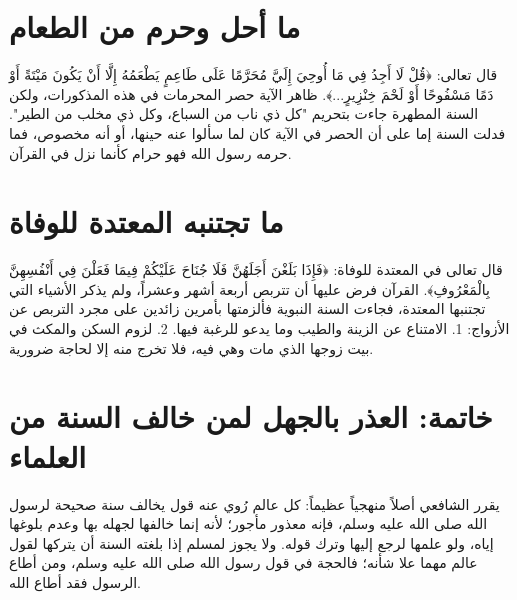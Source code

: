 \section{ما أحل وحرم من الطعام}
قال تعالى: ﴿قُلْ لَا أَجِدُ فِي مَا أُوحِيَ إِلَيَّ مُحَرَّمًا عَلَى طَاعِمٍ يَطْعَمُهُ إِلَّا أَنْ يَكُونَ مَيْتَةً أَوْ دَمًا مَسْفُوحًا أَوْ لَحْمَ خِنْزِيرٍ...﴾.
ظاهر الآية حصر المحرمات في هذه المذكورات، ولكن السنة المطهرة جاءت بتحريم "كل ذي ناب من السباع، وكل ذي مخلب من الطير". فدلت السنة إما على أن الحصر في الآية كان لما سألوا عنه حينها، أو أنه مخصوص، فما حرمه رسول الله فهو حرام كأنما نزل في القرآن.

\section{ما تجتنبه المعتدة للوفاة}
قال تعالى في المعتدة للوفاة: ﴿فَإِذَا بَلَغْنَ أَجَلَهُنَّ فَلَا جُنَاحَ عَلَيْكُمْ فِيمَا فَعَلْنَ فِي أَنْفُسِهِنَّ بِالْمَعْرُوفِ﴾.
القرآن فرض عليها أن تتربص أربعة أشهر وعشراً، ولم يذكر الأشياء التي تجتنبها المعتدة، فجاءت السنة النبوية فألزمتها بأمرين زائدين على مجرد التربص عن الأزواج: 
1. الامتناع عن الزينة والطيب وما يدعو للرغبة فيها.
2. لزوم السكن والمكث في بيت زوجها الذي مات وهي فيه، فلا تخرج منه إلا لحاجة ضرورية.

\section{خاتمة: العذر بالجهل لمن خالف السنة من العلماء}
يقرر الشافعي أصلاً منهجياً عظيماً: كل عالم رُوي عنه قول يخالف سنة صحيحة لرسول الله صلى الله عليه وسلم، فإنه معذور مأجور؛ لأنه إنما خالفها لجهله بها وعدم بلوغها إياه، ولو علمها لرجع إليها وترك قوله. ولا يجوز لمسلم إذا بلغته السنة أن يتركها لقول عالم مهما علا شأنه؛ فالحجة في قول رسول الله صلى الله عليه وسلم، ومن أطاع الرسول فقد أطاع الله.